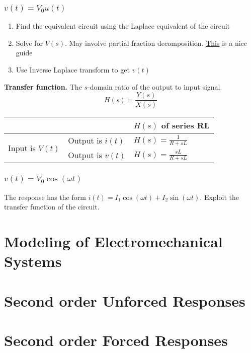 \documentclass[a4paper,11pt]{article}
\begin{document}
	\subsubsection{$v(t) = V_0u(t)$}
	\begin{enumerate}
		\item Find the equivalent circuit using the Laplace equivalent of the circuit
		\item Solve for $V(s)$. May involve partial fraction decomposition. \href{https://cnx.org/exports/b2e3f8ad-9e60-4421-a343-97e64192ffce\%4015.pdf/partial-fraction-expansion-15.pdf}{This} is a nice guide
		\item Use Inverse Laplace transform to get $v(t)$ 
	\end{enumerate}
	\textbf{Transfer function.} The $s$-domain ratio of the output to input signal. 
	\begin{equation}
	H(s) = \frac{Y(s)}{X(s)}
	\end{equation}
	\begin{center}
	\begin{tabular}{|l|l|l|}
		\hline
		& & $H(s)$ of series RL \\ \hline
		\multirow{2}{*}{Input is $V(t)$} & Output is $i(t)$ & $H(s) = \frac{1}{R + sL}$ \\ \cline{2-3}
		& Output is $v(t)$ & $H(s) = \frac{sL}{R + sL}$ \\ \hline
	\end{tabular}
	\end{center}
	
	\subsubsection{$v(t) = V_0\cos(\omega t)$}
	The response has the form $i(t) = I_1\cos(\omega t) + I_2\sin(\omega t)$. Exploit the transfer function of the circuit. 
	
	\section{Modeling of Electromechanical Systems}
	\section{Second order Unforced Responses}
	\section{Second order Forced Responses}
	
	
\end{document}
